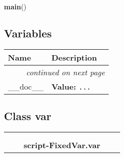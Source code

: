     \vspace{0.5ex}

\hspace{.8\funcindent}\begin{boxedminipage}{\funcwidth}

    \raggedright \textbf{main}()

\setlength{\parskip}{2ex}
\setlength{\parskip}{1ex}
    \end{boxedminipage}



  \subsection{Variables}

    \vspace{-1cm}
\hspace{\varindent}\begin{longtable}{|p{\varnamewidth}|p{\vardescrwidth}|l}
\cline{1-2}
\cline{1-2} \centering \textbf{Name} & \centering \textbf{Description}& \\
\cline{1-2}
\endhead\cline{1-2}\multicolumn{3}{r}{\small\textit{continued on next page}}\\\endfoot\cline{1-2}
\endlastfoot\raggedright \_\-\_\-d\-o\-c\-\_\-\_\- & \raggedright \textbf{Value:} 
{\tt \texttt{...}}&\\
\cline{1-2}
\end{longtable}



\subsection{Class var}

    \label{script-FixedVar:var}
\begin{tabular}{cccccc}
\multicolumn{2}{r}{\settowidth{\BCL}{object}\multirow{2}{\BCL}{object}}
&&
  \\\cline{3-3}
  &&\multicolumn{1}{c|}{}
&&
  \\
&&\multicolumn{2}{l}{\textbf{script-FixedVar.var}}
\end{tabular}

